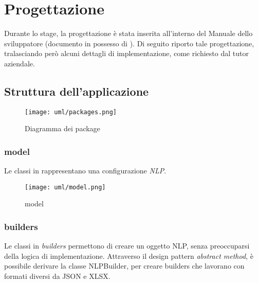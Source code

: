 \section{Progettazione}
\label{sec:progettazione}
Durante lo stage, la progettazione è stata inserita all'interno del Manuale dello sviluppatore (documento in possesso di \company). Di seguito riporto tale progettazione, tralasciando però alcuni dettagli di implementazione, come richiesto dal tutor aziendale.

\subsection{Struttura dell'applicazione}
\begin{figure}[H]
    \centering
    \texttt{[image: uml/packages.png]} 
    \caption{Diagramma dei package}
    \label{logo:company}
\end{figure}

\subsubsection{model} %
Le classi in  rappresentano una configurazione \textit{NLP}.

\begin{namespacedesc}
\end{namespacedesc}
\begin{figure}[H]
    \centering
    \texttt{[image: uml/model.png]} 
    \caption{model}
    \label{logo:company}
\end{figure}

\subsubsection{builders} %
Le classi in \textit{builders} permettono di creare un oggetto NLP, senza preoccuparsi della logica di implementazione. Attraverso il design pattern \textit{abstract method}, è possibile derivare la classe NLPBuilder, per creare builders che lavorano con formati diversi da JSON e XLSX.

